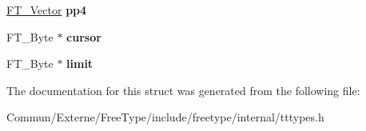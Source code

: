 \begin{DoxyCompactItemize}
\item 
\hyperlink{struct_f_t___vector__}{F\+T\+\_\+\+Vector} {\bfseries pp4}\hypertarget{struct_t_t___loader_rec___a0608203207c3fc735046b8baef4b9201}{}\label{struct_t_t___loader_rec___a0608203207c3fc735046b8baef4b9201}

\item 
F\+T\+\_\+\+Byte $\ast$ {\bfseries cursor}\hypertarget{struct_t_t___loader_rec___a6769a96f37ca22801f6199937cbe9ca7}{}\label{struct_t_t___loader_rec___a6769a96f37ca22801f6199937cbe9ca7}

\item 
F\+T\+\_\+\+Byte $\ast$ {\bfseries limit}\hypertarget{struct_t_t___loader_rec___a1b07761e8ea436c38b4c42117a00a0ff}{}\label{struct_t_t___loader_rec___a1b07761e8ea436c38b4c42117a00a0ff}

\end{DoxyCompactItemize}


The documentation for this struct was generated from the following file\+:\begin{DoxyCompactItemize}
\item 
Commun/\+Externe/\+Free\+Type/include/freetype/internal/tttypes.\+h\end{DoxyCompactItemize}
